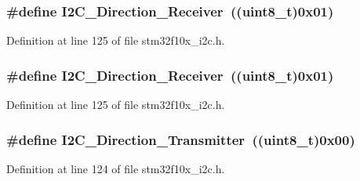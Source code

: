 \subsubsection[{\texorpdfstring{I2\+C\+\_\+\+Direction\+\_\+\+Receiver}{I2C_Direction_Receiver}}]{\setlength{\rightskip}{0pt plus 5cm}\#define I2\+C\+\_\+\+Direction\+\_\+\+Receiver~(({\bf uint8\+\_\+t})0x01)}\hypertarget{group___i2_c__transfer__direction_gafe3b9b98552980ca56c8e21a90040fa0}{}\label{group___i2_c__transfer__direction_gafe3b9b98552980ca56c8e21a90040fa0}


Definition at line 125 of file stm32f10x\+\_\+i2c.\+h.

\subsubsection[{\texorpdfstring{I2\+C\+\_\+\+Direction\+\_\+\+Receiver}{I2C_Direction_Receiver}}]{\setlength{\rightskip}{0pt plus 5cm}\#define I2\+C\+\_\+\+Direction\+\_\+\+Receiver~(({\bf uint8\+\_\+t})0x01)}\hypertarget{group___i2_c__transfer__direction_gafe3b9b98552980ca56c8e21a90040fa0}{}\label{group___i2_c__transfer__direction_gafe3b9b98552980ca56c8e21a90040fa0}


Definition at line 125 of file stm32f10x\+\_\+i2c.\+h.

\subsubsection[{\texorpdfstring{I2\+C\+\_\+\+Direction\+\_\+\+Transmitter}{I2C_Direction_Transmitter}}]{\setlength{\rightskip}{0pt plus 5cm}\#define I2\+C\+\_\+\+Direction\+\_\+\+Transmitter~(({\bf uint8\+\_\+t})0x00)}\hypertarget{group___i2_c__transfer__direction_ga9895ee2d7d8cc8ba4daafafa1c3ce1ac}{}\label{group___i2_c__transfer__direction_ga9895ee2d7d8cc8ba4daafafa1c3ce1ac}


Definition at line 124 of file stm32f10x\+\_\+i2c.\+h.

